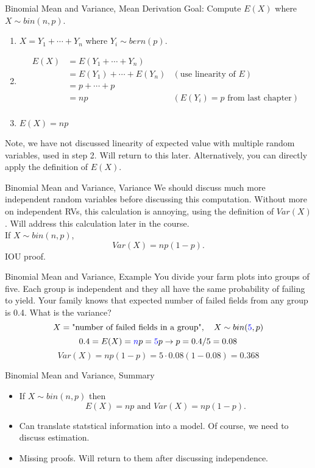 \documentclass[handout]{beamer}
\newcommand{\blue}[1]{{\color{blue} #1}}
\newcommand{\nl}[1]{\vspace{#1 em}}
\begin{document}
    \begin{frame}{Binomial Mean and Variance, Mean Derivation}
        Goal: Compute $E(X)$ where $X \sim bin(n,p)$.
        \begin{enumerate}
            \item $X = Y_1 + \cdots + Y_n$ where $Y_i \sim bern(p)$.
            \item \begin{align*}
                E(X) &= E(Y_1 + \cdots + Y_n) & \\
                & = E(Y_1) + \cdots + E(Y_n) & (\text{use linearity of }E) \\
                & = p + \cdots + p & \\ 
                & = np & (E(Y_i) = p \text{ from last chapter})\\
            \end{align*}
            \item $E(X) = np$
        \end{enumerate}
        Note, we have not discussed linearity of expected value with multiple random variables, used in step 2. Will return to this later. Alternatively, you can directly apply the definition of $E(X)$.
    \end{frame}
    \begin{frame}{Binomial Mean and Variance, Variance}
        We should discuss much more independent random variables before discussing this computation. Without more on independent RVs, this calculation is annoying, using the definition of $Var(X)$. Will address this calculation later in the course.
        \\ \nl{0.5}
        If $X \sim bin(n,p)$,
        $$ Var(X) = np(1-p). $$
        IOU proof.
    \end{frame}
    \begin{frame}{Binomial Mean and Variance, Example}
        You divide your farm plots into groups of \blue{five}. Each group is independent and they all have the same probability of failing to yield. Your family knows that expected number of failed fields from any group is 0.4. What is the variance?
        \pause \\ \nl{0.5}
        $$X = \text{"number of failed fields in a group"}, \hskip 1em X\sim bin(\blue{5},p)$$
        \pause $$0.4 = E(X) = \blue{n}p = \blue{5} p  \rightarrow p = 0.4/5 = 0.08$$
        \pause $$Var(X) = np(1-p) = 5\cdot 0.08(1-0.08) = 0.368$$
    \end{frame}
    \begin{frame}{Binomial Mean and Variance, Summary}
        \begin{itemize}
        \item If $X \sim bin(n,p)$ then
        $$ E(X) = np \text{ and } Var(X) = np(1-p).$$
        \item Can translate statstical information into a model. Of course, we need to discuss estimation.
        \item Missing proofs. Will return to them after discussing independence.
        \end{itemize}
    \end{frame}
\end{document}
